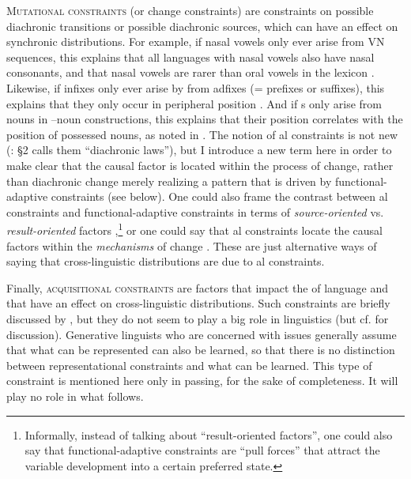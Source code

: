 \documentclass[output=paper]{langsci/langscibook}
\begin{document}
\textsc{Mutational constraints} (or change constraints) are constraints on possible diachronic transitions or possible diachronic sources, which can have an effect on synchronic distributions. For example, if nasal vowels only ever arise from VN sequences, this explains that all languages with nasal vowels also have nasal consonants, and that nasal vowels are rarer than oral vowels in the lexicon \citep{Greenberg1978_Diachr}. Likewise, if infixes only ever arise by  from adfixes (= prefixes or suffixes), this explains that they only occur in peripheral position \citep[51]{Plank2007}. And if s only arise from nouns in –noun constructions, this explains that their position correlates with the position of possessed nouns, as noted in . The notion of al constraints is not new (\citealt{Plank2007}: §2 calls them “diachronic laws”), but I introduce a new term here in order to make clear that the causal factor is located within the process of change, rather than diachronic change merely realizing a pattern that is driven by functional-adaptive constraints (see  below). One could also frame the contrast between al constraints and functional-adaptive constraints in terms of \textit{source-oriented} vs. \textit{result-oriented} factors \citep{Cristofaro2017},\footnote{Informally, instead of talking about “result-oriented factors”, one could also say that functional-adaptive constraints are “pull forces” that attract the variable development into a certain preferred state.} or one could say that al constraints locate the causal factors within the \textit{mechanisms} of change \citep{Bybee2006}. These are just alternative ways of saying that cross-linguistic distributions are due to al constraints.

Finally, \textsc{acquisitional constraints} are factors that impact the  of language and that have an effect on cross-linguistic distributions. Such constraints are briefly discussed by \citet{Anderson2016}, but they do not seem to play a big role in linguistics (but cf.  for discussion). Generative linguists who are concerned with  issues generally assume that what can be represented can also be learned, so that there is no distinction between representational constraints and what can be learned. This type of constraint is mentioned here only in passing, for the sake of completeness. It will play no role in what follows.
\end{document}
